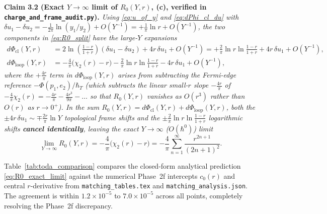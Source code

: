\documentclass[11pt,a4paper]{article}
\newcommand{\hb}{\hbar}
\begin{document}
\medskip\noindent
\textbf{Claim 3.2 (Exact $Y\to\infty$ limit of $R_0(Y,r)$, \textbf{(c)}, verified in \texttt{charge\_and\_frame\_audit.py}).}
\emph{Using \eqref{eq:u_of_y} and \eqref{eq:dPhi_cl_du} with $\delta u_1 - \delta u_2 = -\frac{1}{2\pi}\ln(y_1/y_2) + O(Y^{-1}) = +\frac{1}{\pi}\ln r + O(Y^{-1})$,
the two components in \eqref{eq:R0_split} have the large-$Y$ expansions}
\begin{align}
  d\Phi_{\mathrm{cl}}(Y,r)
  &= 2\ln\!\left(\frac{1-r}{1+r}\right)(\delta u_1 - \delta u_2) + 4r\,\delta u_1 + O(Y^{-1})
   = +\frac{2}{\pi}\ln r\ln\frac{1-r}{1+r} + 4r\,\delta u_1 + O(Y^{-1}),
  \label{eq:dPhi_cl_asymp} \\
  d\Phi_{\mathrm{loop}}(Y,r)
  &= -\frac{4}{\pi}\big(\chi_2(r) - r\big) - \frac{2}{\pi}\ln r\ln\frac{1-r}{1+r} - 4r\,\delta u_1 + O(Y^{-1}),
  \label{eq:dPhi_loop_asymp}
\end{align}
\emph{where the $+\frac{4r}{\pi}$ term in $d\Phi_{\mathrm{loop}}(Y,r)$ arises from
subtracting the Fermi-edge reference $-\Phi(p_1,e_2)/\hb_T$ (which subtracts the
linear small-$r$ slope $-\frac{4r}{\pi}$ of $-\frac{4}{\pi}\chi_2(r) = -\frac{4r}{\pi} - \frac{4r^3}{9\pi} - \dots$
so that $R_0(Y,r)$ vanishes as $O(r^3)$ rather than $O(r)$ as $r\to 0^+$). In the
sum $R_0(Y,r) = d\Phi_{\mathrm{cl}}(Y,r) + d\Phi_{\mathrm{loop}}(Y,r)$, both the
$\pm 4r\,\delta u_1 \sim \mp\frac{2r}{\pi}\ln Y$ topological frame shifts and the
$\pm\frac{2}{\pi}\ln r\ln\frac{1-r}{1+r}$ logarithmic shifts \textbf{cancel
identically}, leaving the exact $Y\to\infty$ ($O(\hb^0)$) limit}
\begin{equation}
  \lim_{Y\to\infty} R_0(Y,r)
  = -\frac{4}{\pi}\big(\chi_2(r) - r\big)
  = -\frac{4}{\pi}\sum_{n=1}^\infty \frac{r^{2n+1}}{(2n+1)^2}.
  \label{eq:R0_exact_limit}
\end{equation}

Table~\ref{tab:toda_comparison} compares the closed-form analytical prediction
\eqref{eq:R0_exact_limit} against the numerical Phase~2f intercepts $c_0(r)$ and
central $r$-derivative from \texttt{matching\_tables.tex} and
\texttt{matching\_analysis.json}. The agreement is within $1.2\times 10^{-5}$ to
$7.0\times 10^{-5}$ across all points, completely resolving the Phase~2f
discrepancy.
\end{document}
